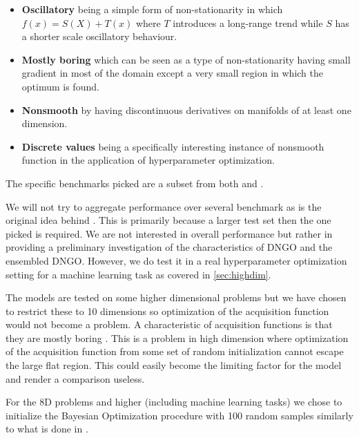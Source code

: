 \documentclass[conference,compsoc]{IEEEtran}
\theoremstyle{definition}
\begin{document}
    \begin{itemize}
        \item \textbf{Oscillatory} being a simple form of non-stationarity in which $f(x) = S(X) + T(x)$ where $T$ introduces a long-range trend while $S$ has a shorter scale oscillatory behaviour.
        \item \textbf{Mostly boring} which can be seen as a type of non-stationarity having small gradient in most of the domain except a very small region in which the optimum is found.
        \item \textbf{Nonsmooth} by having discontinuous
        derivatives on manifolds of at least one dimension. %
        \item \textbf{Discrete values} being a specifically interesting instance of nonsmooth function in the application of hyperparameter optimization.
    \end{itemize}

    The specific benchmarks picked are a subset from both \parencite{eggensperger_towards_2013} and \parencite{dewancker_stratified_2016}.

    We will not try to aggregate performance over several benchmark as is the original idea behind \parencite{dewancker_stratified_2016}.
    This is primarily because a larger test set then the one picked is required.
    We are not interested in overall performance but rather in providing a preliminary investigation of the characteristics of DNGO and the ensembled DNGO.
    However, we do test it in a real hyperparameter optimization setting for a machine learning task as covered in \cref{sec:highdim}.

    The models are tested on some higher dimensional problems but we have chosen to restrict these to 10 dimensions so optimization of the acquisition function would not become a problem.
    A characteristic of acquisition functions is that they are mostly boring \parencite{lyu_batch_2018}.
    This is a problem in high dimension where optimization of the acquisition function from some set of random initialization cannot escape the large flat region.
    This could easily become the limiting factor for the model and render a comparison useless.

    For the 8D problems and higher (including machine learning tasks) we chose to initialize the Bayesian Optimization procedure with 100 random samples similarly to what is done in \parencite{lyu_batch_2018}.
\end{document}
